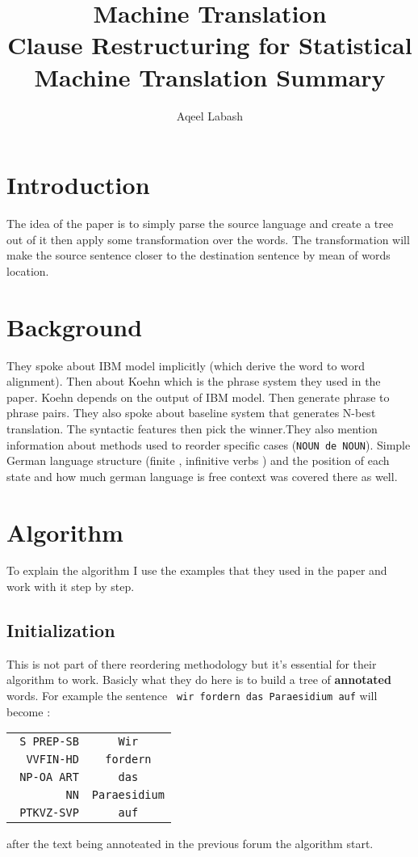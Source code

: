 \documentclass[10pt]{article}
\date{\vspace{-11.5ex}}
\author{\vspace{-10ex}}
\author{\large{Aqeel Labash}\vspace{4ex}}
\title{\vspace{-15ex}\huge{Machine Translation}\\\LARGE{Clause Restructuring for Statistical Machine Translation Summary}\vspace{-2ex}}
\begin{document}
\maketitle
\begin{multicols*}{2}

\section{Introduction}
The idea of the paper is to simply parse the source language and create a tree out of it then apply some transformation over the words. The transformation will make the source sentence closer to the destination sentence by mean of words location.
\section{Background}
They spoke about IBM model implicitly (which derive the word to word alignment). Then about Koehn which is the phrase system they used in the paper. Koehn depends on the output of IBM model. Then  generate phrase to phrase pairs. They also spoke about baseline system that generates N-best translation. The syntactic features then pick the winner.They also mention information about methods used to reorder specific cases (\texttt{NOUN de     NOUN}). Simple German language structure (finite , infinitive verbs ) and the position of each state and how much german language is free context was covered there as well.
\section{Algorithm}
To explain the algorithm I use the examples that they used in the paper and work with it step by step.
\subsection{Initialization}
This is not part of there reordering methodology but it's essential for their algorithm to work.
Basicly what they do here is to build a tree of \textbf{annotated} words. For example the sentence \texttt{ wir fordern das Paraesidium auf} will become : 
\begin{tabular}{rc}
\texttt{S PREP-SB}& \texttt{Wir}\\
\texttt{  VVFIN-HD}& \texttt{fordern}\\
\texttt{  NP-OA ART}& \texttt{das}\\
\texttt{  NN}& \texttt{Paraesidium}\\
\texttt{  PTKVZ-SVP}& \texttt{auf}\\
\end{tabular}
\label{intro:example}
\begin{flushleft}
after the text being annoteated in the previous forum the algorithm start.

\end{flushleft}
\end{multicols*}
\end{document}
